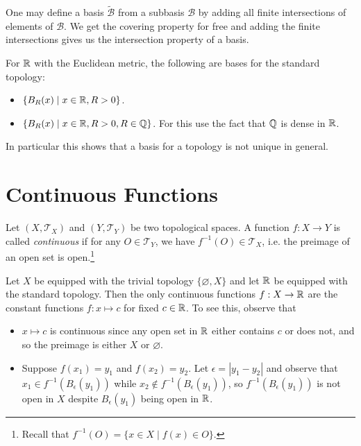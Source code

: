 \begin{remark}
  One may define a basis $\widetilde{\mathcal{B}}$ from a
  subbasis $\mathcal{B}$ by adding all finite intersections
  of elements of $\mathcal{B}$.
  We get the covering property for free and adding
  the finite intersections gives us the
  intersection property of a basis.
\end{remark}

\begin{example}
  For $\mathbb{R}$ with the Euclidean metric, the following
  are bases for the standard topology:
  \begin{itemize}
    \item $\{B_R(x) \mid x \in \mathbb{R}, R > 0\}$.
    \item $\{B_R(x) \mid x \in \mathbb{R}, R > 0, R \in \mathbb{Q}\}$.
      For this use the fact that $\mathbb{Q}$ is dense in $\mathbb{R}$.
  \end{itemize}
  In particular this shows that a basis for a topology
  is not unique in general.
\end{example}

\section{Continuous Functions}

\begin{definition}
  Let $(X, \mathcal{T}_X)$ and $(Y, \mathcal{T}_Y)$
  be two topological spaces. A function $f : X \to Y$
  is called \emph{continuous} if for any
  $O \in \mathcal{T}_Y$, we have
  $f^{-1}(O) \in \mathcal{T}_X$, i.e. the
  preimage of an open set is open.\footnote{Recall that $f^{-1}(O) = \{x \in X \mid f(x) \in O\}$.}
\end{definition}

\begin{example}
  Let $X$ be equipped with the trivial
  topology $\{\varnothing, X\}$ and let
  $\mathbb{R}$ be equipped with the standard topology.
  Then the only continuous functions $f : X \to \mathbb{R}$
  are the constant functions $f : x \mapsto c$
  for fixed $c \in \mathbb{R}$. To see this, observe that
  \begin{itemize}
    \item $x \mapsto c$ is continuous since
      any open set in $\mathbb{R}$ either contains $c$ or does not,
      and so the preimage is either $X$ or $\varnothing$.
    \item Suppose $f(x_1) = y_1$ and $f(x_2) = y_2$.
      Let $\epsilon = |y_1 - y_2|$ and observe that
      $x_1 \in f^{-1}(B_\epsilon(y_1))$ while
      $x_2 \notin f^{-1}(B_\epsilon(y_1))$, so
      $f^{-1}(B_\epsilon(y_1))$ is not open
      in $X$ despite $B_\epsilon(y_1)$ being open in $\mathbb{R}$.
  \end{itemize}
\end{example}


